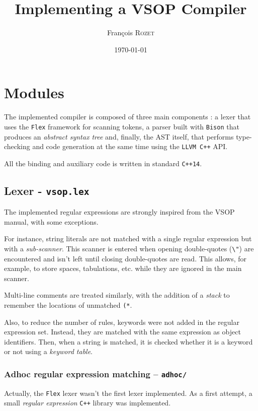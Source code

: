 \documentclass[a4paper, 12pt]{article}
\title{Implementing a VSOP Compiler}
\author{François \textsc{Rozet}}
\date{\today}
\begin{document}
	\maketitle
	
	\section{Modules}
	
	The implemented compiler is composed of three main components : a lexer that uses the \texttt{Flex} framework for scanning tokens, a parser built with \texttt{Bison} that produces an \emph{abstract syntax tree} and, finally, the AST itself, that performs type-checking and code generation at the same time using the \texttt{LLVM C++} API.
	
	All the binding and auxiliary code is written in standard \texttt{C++14}.
	
	\subsection{Lexer - \texttt{vsop.lex}}
	
	The implemented regular expressions are strongly inspired from the VSOP manual, with some exceptions.
	
	For instance, string literals are not matched with a single regular expression but with a \emph{sub-scanner}. This scanner is entered when opening double-quotes (\texttt{\textbackslash"}) are encountered and isn't left until closing double-quotes are read. This allows, for example, to store spaces, tabulations, etc. while they are ignored in the main scanner.
	
	Multi-line comments are treated similarly, with the addition of a \emph{stack} to remember the locations of unmatched \texttt{(*}.
	
	Also, to reduce the number of rules, keywords were not added in the regular expression set. Instead, they are matched with the same expression as object identifiers. Then, when a string is matched, it is checked whether it is a keyword or not using a \emph{keyword table}.
	
	\subsubsection{Adhoc regular expression matching -- \texttt{adhoc/}}
	
	Actually, the \texttt{Flex} lexer wasn't the first lexer implemented. As a first attempt, a small \emph{regular expression} \texttt{C++} library was implemented.
	
\end{document}
